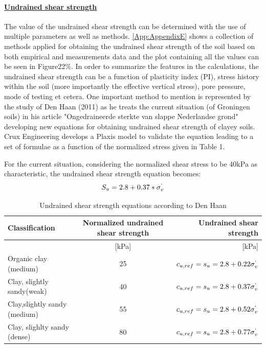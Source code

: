 \documentclass[10pt,a4paper]{report}
\begin{document}
\paragraph{\underline{Undrained shear strength}}
The value of the undrained shear strength can be determined with the use of multiple parameters as well as methods. \ref{App:AppendixE} shows a collection of methods applied for obtaining the undrained shear strength of the soil based on both empirical and measurements data and the plot containing all the values can be seen in Figure22\%. In order to summarize the features in the calculations, the undrained shear strength can be a function of plasticity index (PI), stress history within the soil (more importantly the effective  vertical stress), pore pressure, mode of testing et cetera.
One important method to mention is represented by the study of Den Haan (2011) as he treats the current situation (of Groningen soils) in his article "Ongedraineerde sterkte van slappe Nederlandse grond" developing new equations for obtaining undrained shear strength of clayey soils. Crux Engineering develops a Plaxis model to validate the equation leading to a set of formulae as a function of the normalized stress given in Table 1.

For the current situation, considering the normalized shear stress to be 40kPa as characteristic, the undrained shear strength equation becomes:
\begin{equation}
	S_u=2.8+0.37*\sigma^`_v
\end{equation}

\begin{table}[h!]
	\centering
	\begin{tabular}{|l|c|r|}
		\hline Classification       &      Normalized undrained shear strength   &  Undrained shear strength\\
		\hline [-]  &  [kPa]  & [kPa]   \\ 
		\hline Organic clay (medium)    & 25 &  $c_{u,ref} =s_u=2.8+0.22\sigma^`_v$ \\ 
		\hline Clay, slightly sandy(weak)  & 40  &   $c_{u,ref} =s_u=2.8+0.37\sigma^`_v$   \\ 
		\hline Clay,slightly sandy (medium) &  55  &  $c_{u,ref} =s_u=2.8+0.52\sigma^`_v$     \\ 
		\hline Clay, slighlty sandy (dense) & 80  &  $c_{u,ref} =s_u=2.8+0.77\sigma^`_v$     \\ 
		\hline
	\end{tabular}

	\caption{Undrained shear strength equations according to Den Haan}
	\label{DenHaan_param}
\end{table}
\end{document}
